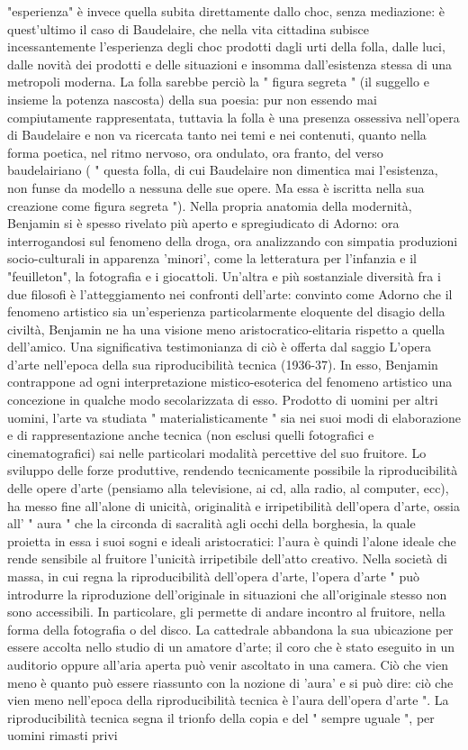 "esperienza" è invece quella subita direttamente dallo choc, senza mediazione: è quest'ultimo il caso di Baudelaire, che nella vita cittadina subisce incessantemente l'esperienza degli choc prodotti dagli urti della folla, dalle luci, dalle novità dei prodotti e delle situazioni e insomma dall'esistenza stessa di una metropoli moderna. La folla sarebbe perciò la " figura segreta " (il suggello e insieme la potenza nascosta) della sua poesia: pur non essendo mai compiutamente rappresentata, tuttavia la folla è una presenza ossessiva nell'opera di Baudelaire e non va ricercata tanto nei temi e nei contenuti, quanto nella forma poetica, nel ritmo nervoso, ora ondulato, ora franto, del verso baudelairiano ( " questa folla, di cui Baudelaire non dimentica mai l'esistenza, non funse da modello a nessuna delle sue opere. Ma essa è iscritta nella sua creazione come figura segreta "). Nella propria anatomia della modernità, Benjamin si è spesso rivelato più aperto e spregiudicato di Adorno: ora interrogandosi sul fenomeno della droga, ora analizzando con simpatia produzioni socio-culturali in apparenza 'minori', come la letteratura per l'infanzia e il "feuilleton", la fotografia e i giocattoli. Un'altra e più sostanziale diversità fra i due filosofi è l'atteggiamento nei confronti dell'arte: convinto come Adorno che il fenomeno artistico sia un'esperienza particolarmente eloquente del disagio della civiltà, Benjamin ne ha una visione meno aristocratico-elitaria rispetto a quella dell'amico. Una significativa testimonianza di ciò è offerta dal saggio L'opera d'arte nell'epoca della sua riproducibilità tecnica (1936-37). In esso, Benjamin contrappone ad ogni interpretazione mistico-esoterica del fenomeno artistico una concezione in qualche modo secolarizzata di esso. Prodotto di uomini per altri uomini, l'arte va studiata " materialisticamente " sia nei suoi modi di elaborazione e di rappresentazione anche tecnica (non esclusi quelli fotografici e cinematografici) sai nelle particolari modalità percettive del suo fruitore. Lo sviluppo delle forze produttive, rendendo tecnicamente possibile la riproducibilità delle opere d'arte (pensiamo alla televisione, ai cd, alla radio, al computer, ecc), ha messo fine all'alone di unicità, originalità e irripetibilità dell'opera d'arte, ossia all' " aura " che la circonda di sacralità agli occhi della borghesia, la quale proietta in essa i suoi sogni e ideali aristocratici: l'aura è quindi l'alone ideale che rende sensibile al fruitore l'unicità irripetibile dell'atto creativo. Nella società di massa, in cui regna la riproducibilità dell'opera d'arte, l'opera d'arte " può introdurre la riproduzione dell'originale in situazioni che all'originale stesso non sono accessibili. In particolare, gli permette di andare incontro al fruitore, nella forma della fotografia o del disco. La cattedrale abbandona la sua ubicazione per essere accolta nello studio di un amatore d'arte; il coro che è stato eseguito in un auditorio oppure all'aria aperta può venir ascoltato in una camera. Ciò che vien meno è quanto può essere riassunto con la nozione di 'aura' e si può dire: ciò che vien meno nell'epoca della riproducibilità tecnica è l'aura dell'opera d'arte ". La riproducibilità tecnica segna il trionfo della copia e del " sempre uguale ", per uomini rimasti privi 